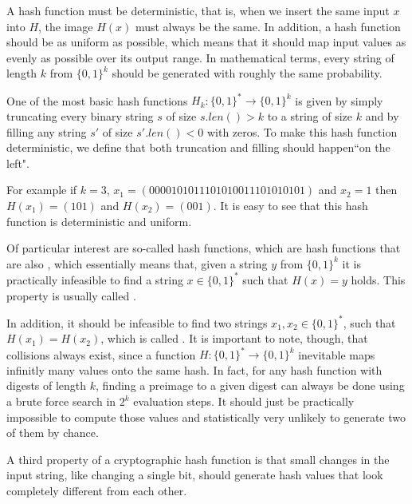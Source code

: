 A hash function must be deterministic, that is, when we insert the same input $x$ into $H$, the image $H(x)$ must always be the same. In addition, a hash function should be as uniform as possible, which means that it should map input values as evenly as possible over its output range. In mathematical terms, every string of length $k$  from $\{0,1\}^k$ should be generated with roughly the same probability.  
\begin{example}\label{ex:k-truncation-hash} One of the most basic hash functions 
$H_k:\{0,1\}^*\to \{0,1\}^k$ is given by simply truncating every binary string $s$ of size $s.len()> k$ to a string of size $k$ and by filling any string $s'$ of size $s'.len()<0$ with zeros. To make this hash function deterministic, we define that both truncation and filling should happen``on the left".

For example if $k=3$, $x_1=(0000101011101010011101010101)$ and $x_2=1$ then $H(x_1)=(101)$ and $H(x_2)=(001)$. It is easy to see that this hash function is deterministic and uniform.
\end{example}
Of particular interest are so-called  hash functions, which are hash functions that are also , which essentially means that, given a string $y$ from $\{0,1\}^k$ it is practically infeasible to find a string $x\in\{0,1\}^*$ such that $H(x)=y$ holds. This property is usually called . 

In addition, it should be infeasible to find two strings $x_1,x_2 \in\{0,1\}^*$, such that $H(x_1)=H(x_2)$, which is called . It is important to note, though, that collisions always exist, since a function $H: \{0,1\}^* \to \{0,1\}^k$ inevitable maps infinitly many values onto the same hash. In fact, for any hash function with digests of length $k$, finding a preimage to a given digest can always be done using a brute force search in $2^k$ evaluation steps. It should just be practically impossible to compute those values and statistically very unlikely to generate two of them by chance. 

A third property of a cryptographic hash function is that small changes in the input string, like changing a single bit, should generate hash values that look completely different from each other.

